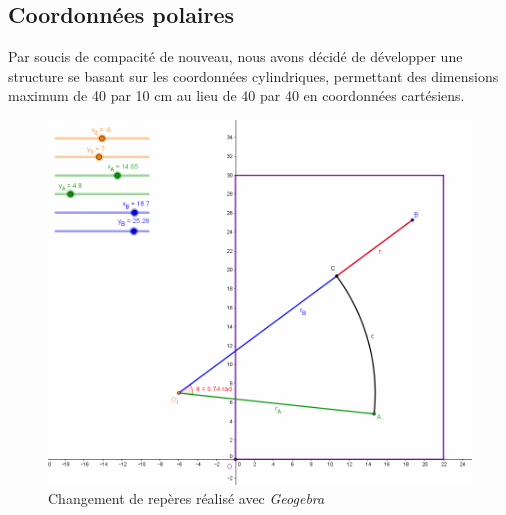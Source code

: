 \documentclass[12pt,a4paper]{report}
\begin{document}
\subsection{Coordonnées polaires}
Par soucis de compacité de nouveau, nous avons décidé de développer une structure se basant sur les coordonnées cylindriques, permettant des dimensions maximum de 40 par 10 cm au lieu de 40 par 40 en coordonnées cartésiens.
\begin{figure}[!h]
 \center
 \includegraphics[scale=0.5]{../pictures/Changement_repere}
 \caption{Changement de repères réalisé avec \emph{Geogebra}}
\end{figure}
\end{document}
